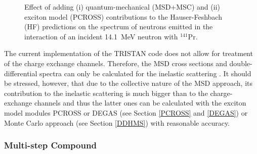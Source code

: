 \documentclass[twocolumn,amsmath,amssymb,10pt,groupedaddress,a4paper]{revtex4}
\begin{document}
\begin{figure}[htbp]
\caption{Effect of adding (i) quantum-mechanical (MSD+MSC) and (ii) exciton model (PCROSS) contributions to the Hauser-Feshbach (HF) predictions on the spectrum of neutrons emitted in the interaction of an incident
14.1~MeV neutron with $^{141}$Pr.}
\label{PrMSD}
\end{figure}


The current implementation of the TRISTAN
code does not allow for treatment of the charge exchange channels.
Therefore, the MSD cross sections and double-differential
spectra can only be calculated for the inelastic scattering . It should
be stressed, however, that due to the collective nature of the MSD
approach, its contribution to the inelastic scattering is much bigger
than to the charge-exchange channels and thus the latter ones can
be calculated with the exciton model modules PCROSS or DEGAS (see Section
\ref{PCROSS} and \ref{DEGAS}) or Monte Carlo approach (see Section \ref{DDHMS}) with
reasonable accuracy.


\subsubsection{Multi-step Compound}
\end{document}
